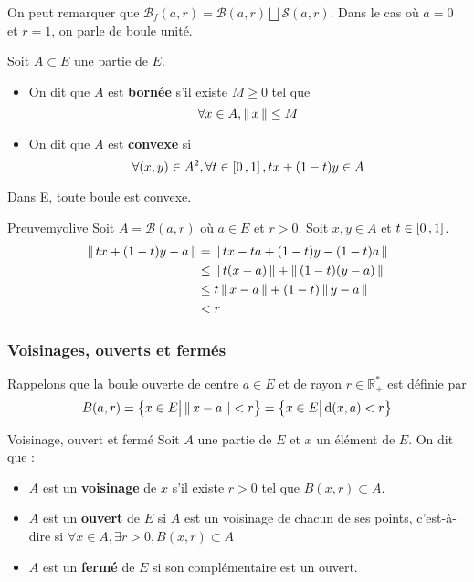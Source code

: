     On peut remarquer que $\mathcal{B}_f(a,r) = \mathcal{B}(a,r) \bigsqcup \mathcal{S}(a,r)$. Dans le cas où $a = 0$ et $r = 1$, on parle de boule unité.

    \begin{defi}{}{}
        Soit $A \subset E$ une partie de $E$. 
        \begin{itemize}
            \item On dit que $A$ est \textbf{bornée} s’il existe $M \geq 0$ tel que 
            \[ \forall x \in A, \left\lVert \,x \, \right\rVert \leq M \]    
            \item On dit que $A$ est \textbf{convexe} si 
            \[ \forall (x,y) \in A^2, \forall t \in \left[ 0 \, , 1 \right], tx + (1-t)y \in A \]  
        \end{itemize}
    \end{defi}

    \begin{prop}{}{}
        Dans E, toute boule est convexe.
    \end{prop}

    \begin{demo}{Preuve}{myolive}
        Soit $A = \mathcal{B}(a,r)$ où $a \in E$ et $r > 0$. Soit $x,y \in A$ et $t \in \left[ 0 \, , 1 \right]$.
        \begin{align*}
            \left\lVert \,tx + (1-t)y - a \, \right\rVert 
            &= \left\lVert \,tx -ta + (1 - t)y - (1-t)a \, \right\rVert \\
            &\leq \left\lVert \,t(x-a) \, \right\rVert + \left\lVert \,(1-t)(y-a) \, \right\rVert \\
            &\leq t\left\lVert \,x-a \, \right\rVert + (1-t)\left\lVert \,y-a \, \right\rVert \\
            &< r
        \end{align*}
    \end{demo}

    \subsubsection{Voisinages, ouverts et fermés}

    Rappelons que la boule ouverte de centre $a \in E$ et de rayon $r \in \mathbb{R}_+^*$ est définie par 
    \[ B(a,r) = \big\{ x \in E \big| \left\lVert \,x - a \, \right\rVert < r \big\} = \big\{ x \in E \big| \operatorname{d}(x,a) < r \big\} \] 

    \begin{defi}{Voisinage, ouvert et fermé}{}
        Soit $A$ une partie de $E$ et $x$ un élément de $E$. On dit que :
        \begin{itemize}
            \item $A$ est un \textbf{voisinage} de $x$ s’il existe $r > 0$ tel que $B(x,r) \subset A$.
            \item $A$ est un \textbf{ouvert} de $E$ si $A$ est un voisinage de chacun de ses points, c’est-à-dire si $ \forall x \in A, \exists r > 0, B(x,r) \subset A$ 
            \item $A$ est un \textbf{fermé} de $E$ si son complémentaire est un ouvert.
        \end{itemize}
    \end{defi}


